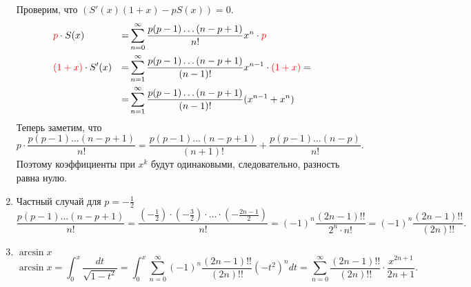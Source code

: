 \begin{enumerate}
\[	  \]
	  Проверим, что $ \left( S'(x) (1+x) - pS(x) \right) = 0$.
	  \[
	  \begin{aligned}
		  &{\color{red}p} \cdot S(x) &=& \sum_{n=0}^{\infty} \frac{p(p-1)\ldots (n-p+1)}{n!}x^{n} \cdot {\color{red}p}
		  \\
		  &{\color{red} (1+x)} \cdot  S'(x) &=& \sum_{n=1}^{\infty} \frac{p(p-1)\ldots (n-p+1)}{(n-1)!} x^{n-1} \cdot  {\color{red} (1+x)} = \\
		  &&=& \sum_{n=1}^{\infty} \frac{p(p-1)\ldots (n-p+1)}{(n-1)!}(x^{n-1} +x^{n})
	  \end{aligned}
	  \]
	  Теперь заметим, что 
	  \[
		  p\cdot  \frac{p(p-1)\ldots (n-p+1)}{n!} = \frac{p(p-1)\ldots (n-p+1)}{(n+1)!} + \frac{p(p-1)\ldots (n-p)}{n!}
	  .\] 
	  Поэтому коэффициенты при $ x^{k}$ будут одинаковыми, следовательно, разность равна нулю.
  \item Частный случай для $ p=-\frac{1}{2}$
	   \[
		   \frac{ p(p-1)\ldots (n-p+1)}{n!} = \frac{\left( -\frac{1}{2} \right) \cdot \left( -\frac{3}{2} \right) \cdot \ldots \cdot \left( -\frac{2n-1}{2} \right) }{n!} = (-1)^{n} \frac{(2n-1)!!}{2^{n}\cdot n!} = (-1)^{n} \frac{(2n-1)!!}{(2n)!!}
	   .\] 
   \item $ \arcsin x$
	   \[
		   \arcsin x = \int_{0}^{x} \frac{dt}{\sqrt{ 1-t^2} } = \int_{0}^{x} \sum_{n=0}^{\infty} (-1)^{n} \frac{(2n-1)!!}{(2n)!!} (-t^2)^{n} dt = \sum_{n=0}^{\infty} \frac{(2n-1)!!}{(2n)!!}\cdot  \frac{x^{2n+1}}{2n+1}
	   .\] 
\end{enumerate} 

